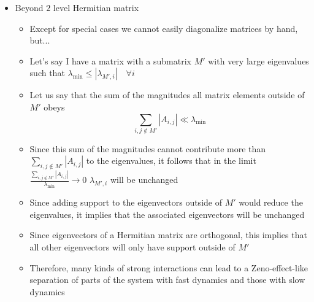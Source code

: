 \documentclass[english]{article}
\newcommand{\ket}[1]{|#1 \rangle}
\begin{document}
\begin{itemize}
\begin{itemize}
\item Same trick, diagonalize matrix by hand 
\begin{equation}
\det\left(\begin{array}{cc} -\lambda & 1 \\ 1 & i\Gamma-\lambda \end{array}\right)=0
\end{equation}
\item $\lambda^2-i\Gamma\lambda-1=0$ from an application of the quadratic formula $\lambda_{\pm}=\frac{i\Gamma \pm\sqrt{-\Gamma^2+4}}{2}$
\item Simple eigenvector equation $v_1=\lambda_{\pm}v_0$
\item  Since $\lambda_{-}\rightarrow 0$, than $\frac{v_1}{v_0}\rightarrow 0$ for this eigenvalue and therefore $\ket{0}$ tends toward an eigenstate, just as it did with phases
\end{itemize}
\item Beyond $2$ level Hermitian matrix
\begin{itemize}
\item Except for special cases we cannot easily diagonalize matrices by hand, but...
\item Let's say I have a matrix with a submatrix $M'$ with very large eigenvalues such that $\lambda_{\mathrm{min}}\le|\lambda_{M',i}| \quad \forall i$
\item Let us say that the sum of the magnitudes all matrix elements outside of $M'$ obeys
\begin{equation}
\sum_{i,j\notin M'}|A_{i,j}|\ll\lambda_{\mathrm{min}}
\end{equation}
\item Since this sum of the magnitudes cannot contribute more than $\sum_{i,j\notin M'}|A_{i,j}|$ to the eigenvalues, it follows that in the limit $\frac{\sum_{i,j\notin M'}|A_{i,j}|}{\lambda_{\mathrm{min}}}\rightarrow 0$ $\lambda_{M',i}$  will be unchanged
\item Since adding support to the eigenvectors outside of $M'$ would reduce the eigenvalues, it implies that the associated eigenvectors will be unchanged
\item Since eigenvectors of a Hermitian matrix are orthogonal, this implies that all other eigenvectors will only have support outside of $M'$
\item Therefore, many kinds of strong interactions can lead to a Zeno-effect-like separation of parts of the system with fast dynamics and those with slow dynamics
\end{itemize}

\end{itemize}
\end{document}
